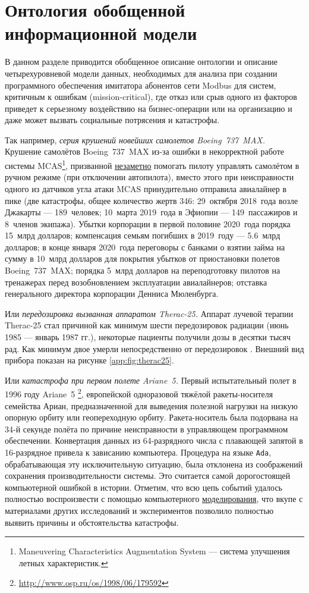 \chapter{Онтология обобщенной информационной модели}\label{sec:part1}
В данном разделе приводится обобщенное описание онтологии и описание четырехуровневой модели данных,
необходимых для анализа при создании программного обеспечения имитатора абонентов сети Modbus
для систем, критичным к ошибкам (mission-critical),
где отказ или срыв одного из факторов приведет к серьезному воздействию на бизнес-операции или на организацию
и даже может вызвать социальные потрясения и катастрофы.

Так например, \textit{серия крушений новейших самолетов Boeing~737~MAX.}
Крушение самолётов Boeing~737~MAX из-за ошибки в некорректной работе системы
MCAS\footnote{Maneuvering Characteristics Augmentation System --- система улучшения летных характеристик.},
призванной \underline{незаметно} помогать пилоту управлять самолётом в ручном режиме (при отключении автопилота),
вместо этого при неисправности одного из датчиков угла атаки MCAS принудительно отправила авиалайнер в пике
(две катастрофы, общее количество жертв 346:
    29~октября 2018~года возле Джакарты --- 189~человек;
    10~марта 2019~года в Эфиопии --- 149~пассажиров и 8~членов экипажа).
Убытки корпорации в первой половине 2020~года порядка 15~млрд долларов;
компенсация семьям погибших в 2019~году --- 5.6~млрд долларов;
в конце января 2020~года переговоры с банками о взятии займа на сумму в 10~млрд долларов для покрытия убытков от приостановки полетов Boeing~737~MAX;
порядка 5~млрд долларов на переподготовку пилотов на тренажерах перед возобновлением эксплуатации авиалайнеров;
отставка генерального директора корпорации Денниса Мюленбурга.

Или \textit{передозировка вызванная аппаратом Therac-25.}
Аппарат лучевой терапии Therac-25 стал причиной как минимум шести передозировок радиации (июнь 1985 --- январь 1987 гг.),
некоторые пациенты получили дозы в десятки тысяч рад. Как минимум двое умерли непосредственно от передозировок \cite{journal:computer:1993:therac25}.
Внешний вид прибора показан на рисунке \ref{app:fig:therac25}.

Или \textit{катастрофа при первом полете Ariane~5.}
Первый испытательный полет в 1996 году Ariane~5
\cite{journal:open_system:1998_adjaev}\footnote{\url{http://www.osp.ru/os/1998/06/179592}},
европейской одноразовой тяжёлой ракеты-носителя семейства Ариан,
предназначенной для выведения полезной нагрузки на низкую опорную орбиту или геопереходную орбиту. 
Ракета-носитель была подорвана на 34-й секунде полёта по причине неисправности в управляющем программном обеспечении.
Конвертация данных из 64-разрядного числа с плавающей запятой в 16-разрядное привела к зависанию компьютера.
Процедура на языке \texttt{Ada}, обрабатывающая эту исключительную ситуацию, была отклонена из соображений сохранения производительности системы.
Это считается самой дорогостоящей компьютерной ошибкой в истории.
Отметим, что всю цепь событий удалось полностью воспроизвести с помощью компьютерного \underline{моделирования},
что вкупе с материалами других исследований и экспериментов позволило полностью выявить причины и обстоятельства катастрофы.

